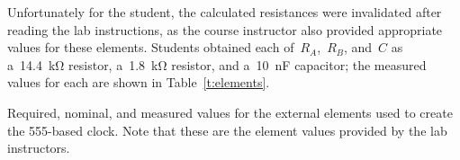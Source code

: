 Unfortunately for the student, the calculated resistances were invalidated
after reading the lab instructions, as the course instructor also provided
appropriate values for these elements.  Students obtained each of~$R_A$,~$R_B$,
and~$C$ as a~\SI{14.4}{\kilo\ohm} resistor, a~\SI{1.8}{\kilo\ohm} resistor, and
a~\SI{10}{\nano\farad} capacitor; the measured values for each are shown in
Table~\ref{t:elements}.
%
\begin{table}[H]
	\centering
	\parbox{.5\textwidth}{
	\caption[Element Values]{Required, nominal, and measured values for the
	external elements used to create the 555-based clock.  Note that these are
	the element values provided by the lab instructors.}
	\label{t:elements}}\\
	
\end{table}

